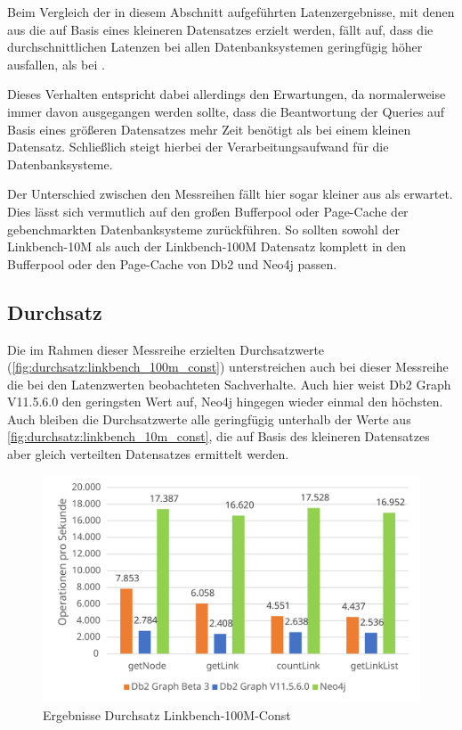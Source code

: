 Beim Vergleich der in diesem Abschnitt aufgeführten Latenzergebnisse, mit denen aus  die auf Basis eines kleineren Datensatzes erzielt werden, fällt auf, dass die durchschnittlichen Latenzen bei allen Datenbanksystemen geringfügig höher ausfallen, als bei . 

Dieses Verhalten entspricht dabei allerdings den Erwartungen, da normalerweise immer davon ausgegangen werden sollte, dass die Beantwortung der Queries auf Basis eines größeren Datensatzes mehr Zeit benötigt als bei einem kleinen Datensatz. Schließlich steigt hierbei der Verarbeitungsaufwand für die Datenbanksysteme. 

Der Unterschied zwischen den Messreihen fällt hier sogar kleiner aus als erwartet. Dies lässt sich vermutlich auf den großen Bufferpool oder Page-Cache der gebenchmarkten Datenbanksysteme zurückführen. So sollten sowohl der Linkbench-10M als auch der Linkbench-100M Datensatz komplett in den Bufferpool oder den Page-Cache von Db2 und Neo4j passen.

\subsection{Durchsatz}
Die im Rahmen dieser Messreihe erzielten Durchsatzwerte (\autoref{fig:durchsatz:linkbench_100m_const}) unterstreichen auch bei dieser Messreihe die bei den Latenzwerten beobachteten Sachverhalte. Auch hier weist Db2 Graph V11.5.6.0 den geringsten Wert auf, Neo4j hingegen wieder einmal den höchsten. Auch bleiben die Durchsatzwerte alle geringfügig unterhalb der Werte aus \autoref{fig:durchsatz:linkbench_10m_const}, die auf Basis des kleineren Datensatzes aber gleich verteilten Datensatzes ermittelt werden. 

\begin{figure}[!ht]
    \centering
    \includegraphics[width=\textwidth]{images/diagramme/linkbench_100m_const_durchsatz.pdf}
    \caption{Ergebnisse Durchsatz Linkbench-100M-Const}
    \label{fig:durchsatz:linkbench_100m_const}
\end{figure}

